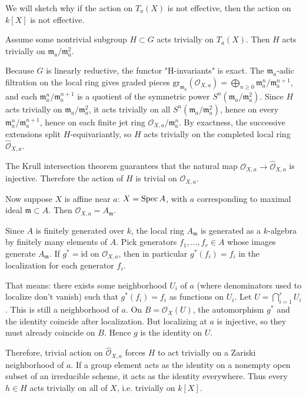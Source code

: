 \documentclass[12pt]{article}
\begin{document}
\begin{remark}
We will sketch why if the action on $T_a(X)$ is not effective, then the action on $k[X]$ is not effective.

Assume some nontrivial subgroup $H\subset G$ acts trivially on $T_a(X)$. Then $H$ acts trivially on $\mathfrak m_a/\mathfrak m_a^2$.

Because $G$ is linearly reductive, the functor "H-invariants" is exact. The $\mathfrak m_a$-adic filtration on the local ring gives graded pieces $\mathrm{gr}_{\mathfrak m_a}(\mathcal O_{X,a}) = \bigoplus_{n\ge 0} \mathfrak m_a^n/\mathfrak m_a^{n+1}$, and each $\mathfrak m_a^n/\mathfrak m_a^{n+1}$ is a quotient of the symmetric power $S^n(\mathfrak m_a/\mathfrak m_a^2)$. Since $H$ acts trivially on $\mathfrak m_a/\mathfrak m_a^2$, it acts trivially on all $S^n(\mathfrak m_a/\mathfrak m_a^2)$, hence on every $\mathfrak m_a^n/\mathfrak m_a^{n+1}$, hence on each finite jet ring $\mathcal O_{X,a}/\mathfrak m_a^n$. By exactness, the successive extensions split $H$-equivariantly, so $H$ acts trivially on the completed local ring $\widehat{\mathcal O}_{X,a}$.

The Krull intersection theorem guarantees that the natural map $\mathcal O_{X,a} \to \widehat{\mathcal O}_{X,a}$ is injective. Therefore the action of $H$ is trivial on $\mathcal O_{X,a}$.

Now suppose $X$ is affine near $a$: $X = \operatorname{Spec} A$, with $a$ corresponding to maximal ideal $\mathfrak m\subset A$. Then $\mathcal O_{X,a} = A_\mathfrak m$.

Since $A$ is finitely generated over $k$, the local ring $A_\mathfrak m$ is generated as a $k$-algebra by finitely many elements of $A$. Pick generators $f_1,\dots,f_r\in A$ whose images generate $A_\mathfrak m$. If $g^*=\mathrm{id}$ on $\mathcal O_{X,a}$, then in particular $g^*(f_i)=f_i$ in the localization for each generator $f_i$.

That means: there exists some neighborhood $U_i$ of $a$ (where denominators used to localize don't vanish) such that $g^*(f_i)=f_i$ as functions on $U_i$. Let $U = \bigcap_{i=1}^r U_i$. This is still a neighborhood of $a$. On $B=\mathcal O_X(U)$, the automorphism $g^*$ and the identity coincide after localization. But localizing at $a$ is injective, so they must already coincide on $B$. Hence $g$ is the identity on $U$.

Therefore, trivial action on $\widehat{\mathcal O}_{X,a}$ forces $H$ to act trivially on a Zariski neighborhood of $a$. If a group element acts as the identity on a nonempty open subset of an irreducible scheme, it acts as the identity everywhere. Thus every $h\in H$ acts trivially on all of $X$, i.e. trivially on $k[X]$.
\end{remark}
\end{document}
